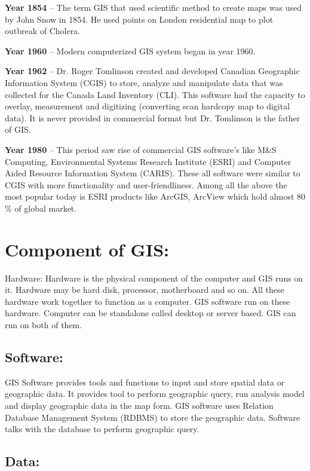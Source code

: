 \documentclass[12pt, letter]{article}
\begin{document}
\textbf{Year 1854} – The term GIS that used scientific method to create maps was used by John Snow in 1854. He used points on London residential map to plot outbreak of Cholera.

\medskip

\textbf{Year 1960} – Modern computerized GIS system began in year 1960.

\medskip

\textbf{Year 1962} – Dr. Roger Tomlinson created and developed Canadian Geographic Information System (CGIS) to store, analyze and manipulate data that was collected for the Canada Land Inventory (CLI). This software had the capacity to overlay, measurement and digitizing (converting scan hardcopy map to digital data). It is never provided in commercial format but Dr. Tomlinson is the father of GIS.

\medskip

\textbf{Year 1980} – This period saw rise of commercial GIS software’s like M\&S Computing, Environmental Systems Research Institute (ESRI) and Computer Aided Resource Information System (CARIS). These all software were similar to CGIS with more functionality and user-friendliness. Among all the above the most popular today is ESRI products like ArcGIS, ArcView which hold almost 80 \% of global market.

\section{Component of GIS:}

Hardware: Hardware is the physical component of the computer and GIS runs on it. Hardware may be hard disk, processor, motherboard and so on. All these hardware work together to function as a computer. GIS software run on these hardware. Computer can be standalone called desktop or server based. GIS can run on both of them.

\subsection{Software:}

GIS Software provides tools and functions to input and store spatial data or geographic data. It provides tool to perform geographic query, run analysis model and display geographic data in the map form. GIS software uses Relation Database Management System (RDBMS) to store the geographic data. Software talks with the database to perform geographic query.

\subsection{Data:}
\end{document}
